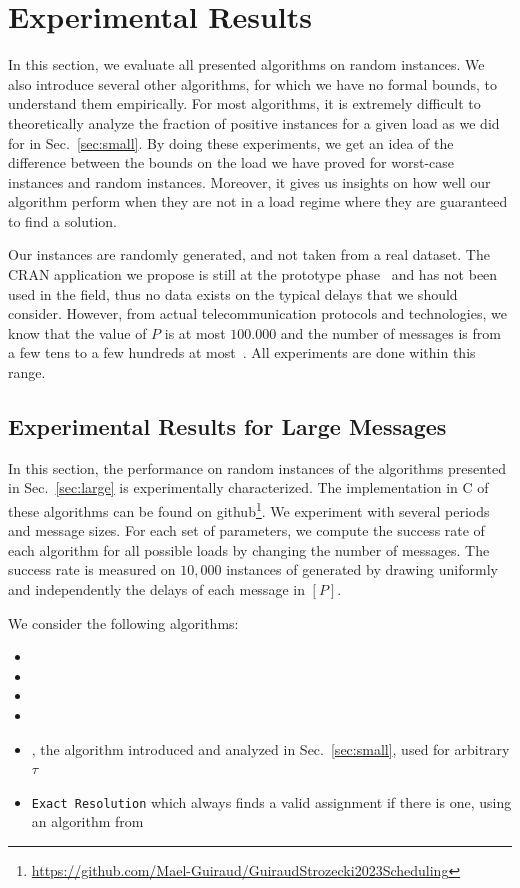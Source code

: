\documentclass[pdflatex,sn-mathphys,iicol]{sn-jnl}%
\theoremstyle{thmstyleone}%
\theoremstyle{thmstyletwo}%
\theoremstyle{thmstylethree}%
\begin{document}
\section{Experimental Results}\label{sec:perf}

In this section, we evaluate all presented algorithms on random instances. We also introduce several other algorithms, for which we have no formal bounds, to understand them empirically. 
For most algorithms, it is extremely difficult to theoretically analyze the fraction of positive instances for a given load as we did for \greedyuniform in Sec.~\ref{sec:small}. By doing these experiments, we get an idea of the difference between the bounds on the load we have proved for worst-case instances and random instances. Moreover, it gives us insights on how well our algorithm perform when they are not in a load regime where they are guaranteed to find a solution.

Our instances are randomly generated, and not taken from a real dataset. The CRAN application we propose
is still at the prototype phase~\cite{guiraud2022experimental} and has not been used in the field, thus no data exists on the typical delays that we should consider. However, from actual telecommunication protocols and technologies, we know that the value of $P$ is at most $100.000$ and the number of messages is from a few tens to a few hundreds at most~\cite{bartharxiv2018deterministic}. All experiments are done within this range.


\subsection{Experimental Results for Large Messages} \label{sec:perf_large}


In this section, the performance on random instances of the algorithms presented in Sec.~\ref{sec:large} is experimentally characterized. The implementation in C of these algorithms can be found on github\footnote{\url{https://github.com/Mael-Guiraud/GuiraudStrozecki2023Scheduling}}. We experiment with several periods and message sizes. For each set of parameters, we compute the success rate of each algorithm for all possible loads by changing the number of messages. The success rate is measured on $10,000$ instances of \pma generated by drawing uniformly and independently the delays of each message in $[P]$. 



We consider the following algorithms:
\begin{itemize}
  \item \firstfit
  \item \metaoffset
  \item \compactpair
  \item \compactfit
  \item \greedyuniform, the algorithm introduced and analyzed in Sec.~\ref{sec:small}, used for arbitrary $\tau$
  \item \texttt{Exact Resolution} which always finds a valid assignment if there is one, using an algorithm from~\cite{bartharxiv2018deterministic}  
\end{itemize}
\end{document}
